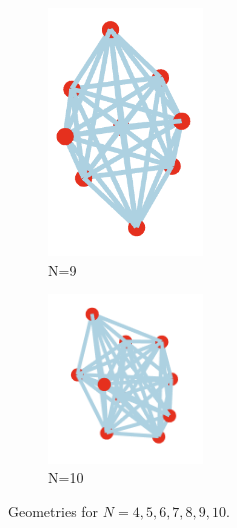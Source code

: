 \documentclass[11pt,onecolumn]{article}
\begin{document}
\begin{figure}[h]
  \begin{subfigure}[b]{0.45\textwidth}
    \centering
    \includegraphics[width=0.45\textwidth]{N9.png}
    \caption{N=9}
    \label{fig:sub3}
  \end{subfigure}
  \hfill
  \begin{subfigure}[b]{0.45\textwidth}
    \centering
    \includegraphics[width=0.45\textwidth]{N10.png}
    \caption{N=10}
    \label{fig:sub4}
  \end{subfigure}

  \caption{Geometries for $N=4,5,6,7,8,9,10$.}
  \label{fig:grid}
\end{figure}


\newpage
\end{document}
